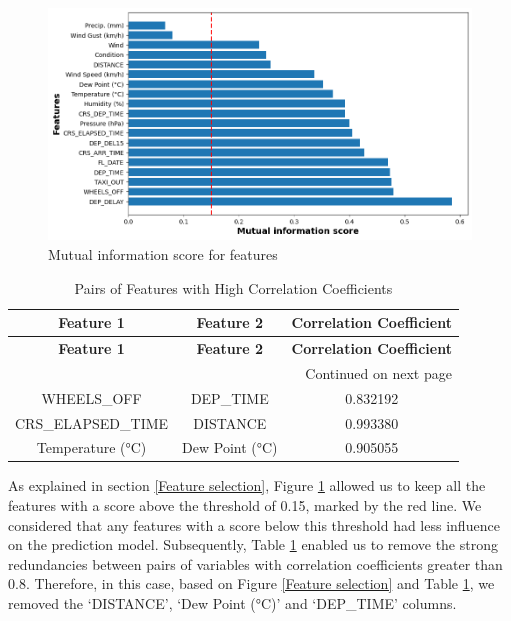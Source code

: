 \documentclass[12pt,oneside]{book} %
\begin{document}
\begin{figure}[H]
    \centering
    \includegraphics[width=1\linewidth]{Image/mutual_information.png}
    \caption{Mutual information score for features}
    \label{fig:mutual_information}
\end{figure}

\setlength\LTleft{2cm}
\begin{longtable}{c c c}
\caption{Pairs of Features with High Correlation Coefficients} \label{tab:correlation}  \\

\hline
\textbf{Feature 1} & \textbf{Feature 2} & \textbf{Correlation Coefficient}\\ \hline
\endfirsthead

\hline
\textbf{Feature 1} & \textbf{Feature 2} & \textbf{Correlation Coefficient} \\ \hline
\endhead

\hline \multicolumn{3}{r}{{Continued on next page}} \\ \hline
\endfoot

\hline
\endlastfoot
WHEELS\_OFF & DEP\_TIME & 0.832192\\
CRS\_ELAPSED\_TIME & DISTANCE & 0.993380\\
Temperature (°C) & Dew Point (°C) & 0.905055\\
\end{longtable}

\noindent As explained in section \ref{Feature selection}, Figure \ref{fig:mutual_information} allowed us to keep all the features with a score above the threshold of 0.15, marked by the red line. We considered that any features with a score below this threshold had less influence on the prediction model. Subsequently, Table \ref{tab:correlation} enabled us to remove the strong redundancies between pairs of variables with correlation coefficients greater than 0.8. Therefore, in this case, based on Figure \ref{Feature selection} and Table \ref{tab:correlation}, we removed the `DISTANCE', `Dew Point (°C)' and `DEP\_TIME' columns.
\end{document}
